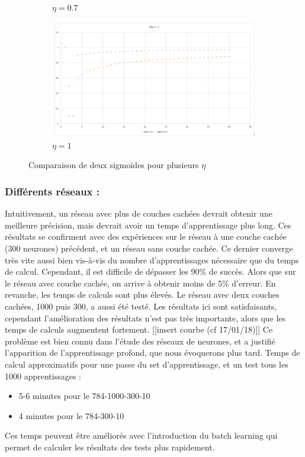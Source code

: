 \begin{figure}[h!]
\begin{subfigure}[b]{.5\linewidth}
    \caption{$\eta=0.7$}
  \end{subfigure}
  \begin{subfigure}[b]{.5\linewidth}
    \includegraphics[width=\linewidth]{fig/MNIST_inflsigm_eta1.png}
    \caption{$\eta=1$}
  \end{subfigure}
  \caption{Comparaison de deux sigmoïdes pour plusieurs $\eta$}
  \label{fig:MNIST_inflsigm}
\end{figure}

\subsubsection*{Différents réseaux :} 
Intuitivement, un réseau avec plus de couches cachées devrait obtenir une meilleure précision, mais devrait avoir un temps d’apprentissage plus long. Ces résultats se confirment avec des expériences sur le réseau à une couche cachée (300 neurones) précédent, et un réseau sans couche cachée. Ce dernier converge très vite aussi bien vis-à-vis du nombre d’apprentissages nécessaire que du temps de calcul. Cependant, il est difficile de dépasser les 90\% de succès. Alors que sur le réseau avec couche cachée, on arrive à obtenir moins de 5\% d’erreur. En revanche, les temps de calculs sont plus élevés. Le réseau avec deux couches cachées, 1000 puis 300, a aussi été testé. Les résultats ici sont satisfaisants, cependant l’amélioration des résultats n’est pas très importante, alors que les temps de calculs augmentent fortement.
[[insert courbe (cf 17/01/18)]]
Ce problème est bien connu dans l'étude des réseaux de neurones, et a justifié l'apparition de l'apprentissage profond, que nous évoquerons plus tard.
Temps de calcul approximatifs pour une passe du set d’apprentissage, et un test tous les 1000 apprentissages :
\begin{itemize}
	\item 5-6 minutes pour le 784-1000-300-10
	\item 4 minutes pour le 784-300-10 
\end{itemize}
Ces temps peuvent être améliorés avec l’introduction du batch learning qui permet de calculer les résultats des tests plus rapidement.